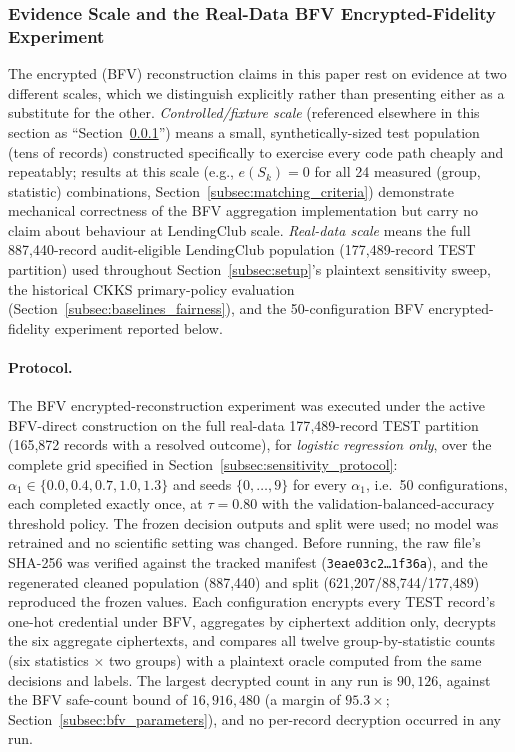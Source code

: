 \documentclass[a4paper,fleqn]{cas-dc}
\begin{document}
\subsubsection{Evidence Scale and the Real-Data BFV Encrypted-Fidelity Experiment} \label{subsec:fixture_scale_note}

The encrypted (BFV) reconstruction claims in this paper rest on evidence at two different scales, which we distinguish explicitly rather than presenting either as a substitute for the other. \emph{Controlled/fixture scale} (referenced elsewhere in this section as ``Section~\ref{subsec:fixture_scale_note}'') means a small, synthetically-sized test population (tens of records) constructed specifically to exercise every code path cheaply and repeatably; results at this scale (e.g., $e(S_k)=0$ for all 24 measured (group, statistic) combinations, Section~\ref{subsec:matching_criteria}) demonstrate mechanical correctness of the BFV aggregation implementation but carry no claim about behaviour at LendingClub scale. \emph{Real-data scale} means the full 887{,}440-record audit-eligible LendingClub population (177{,}489-record TEST partition) used throughout Section~\ref{subsec:setup}'s plaintext sensitivity sweep, the historical CKKS primary-policy evaluation (Section~\ref{subsec:baselines_fairness}), and the 50-configuration BFV encrypted-fidelity experiment reported below.

\label{subsec:bfv_realdata_fidelity}
\paragraph{Protocol.} The BFV encrypted-reconstruction experiment was executed under the active BFV-direct construction on the full real-data 177{,}489-record TEST partition (165{,}872 records with a resolved outcome), for \emph{logistic regression only}, over the complete grid specified in Section~\ref{subsec:sensitivity_protocol}: $\alpha_1\in\{0.0,0.4,0.7,1.0,1.3\}$ and seeds $\{0,\ldots,9\}$ for every $\alpha_1$, i.e.\ 50 configurations, each completed exactly once, at $\tau=0.80$ with the validation-balanced-accuracy threshold policy. The frozen decision outputs and split were used; no model was retrained and no scientific setting was changed. Before running, the raw file's SHA-256 was verified against the tracked manifest (\texttt{3eae03c2\ldots1f36a}), and the regenerated cleaned population (887{,}440) and split (621{,}207/88{,}744/177{,}489) reproduced the frozen values. Each configuration encrypts every TEST record's one-hot credential under BFV, aggregates by ciphertext addition only, decrypts the six aggregate ciphertexts, and compares all twelve group-by-statistic counts (six statistics $\times$ two groups) with a plaintext oracle computed from the same decisions and labels. The largest decrypted count in any run is $90{,}126$, against the BFV safe-count bound of $16{,}916{,}480$ (a margin of $95.3\times$; Section~\ref{subsec:bfv_parameters}), and no per-record decryption occurred in any run.
\end{document}
